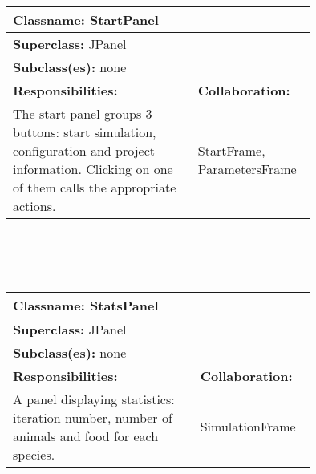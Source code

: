\documentclass{article}
\begin{document}
\\ \\ \\
\begin{tabular}{|p{0.55\linewidth}|p{0.2\linewidth}|}
\hline
\multicolumn{2}{|l|}{\textbf{Classname:} StartPanel} \\
\hline
\multicolumn{2}{|l|}{\textbf{Superclass:} JPanel} \\
\multicolumn{2}{|l|}{\textbf{Subclass(es):} none} \\
\hline
\textbf{Responsibilities:}  &  \textbf{Collaboration:} \\
The start panel groups 3 buttons: start simulation, configuration and project information. Clicking on one of them calls the appropriate actions. & StartFrame, ParametersFrame \\
\hline
\end{tabular}
\\ \\ \\
\begin{tabular}{|p{0.55\linewidth}|p{0.2\linewidth}|}
\hline
\multicolumn{2}{|l|}{\textbf{Classname:} StatsPanel} \\
\hline
\multicolumn{2}{|l|}{\textbf{Superclass:} JPanel} \\
\multicolumn{2}{|l|}{\textbf{Subclass(es):} none} \\
\hline
\textbf{Responsibilities:}  &  \textbf{Collaboration:} \\
A panel displaying statistics: iteration number, number of animals and food for each species. & SimulationFrame \\
\hline
\end{tabular}
\end{document}

